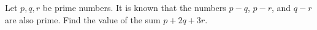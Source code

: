 Let $p, q, r$ be prime numbers. It is known that the numbers $p-q$, $p-r$, and $q-r$ are also prime. Find the value of the sum $p+2q+3r$.
